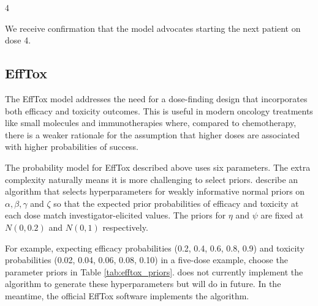 \documentclass[article]{jss}
\begin{document}
\begin{CodeChunk}


\begin{CodeOutput}
[1] 4
\end{CodeOutput}
\end{CodeChunk}

We receive confirmation that the model advocates starting the next
patient on dose 4.

\hypertarget{efftox-1}{%
\subsection{EffTox}\label{efftox-1}}

The EffTox model addresses the need for a dose-finding design that
incorporates both efficacy and toxicity outcomes. This is useful in
modern oncology treatments like small molecules and immunotherapies
where, compared to chemotherapy, there is a weaker rationale for the
assumption that higher doses are associated with higher probabilities of
success.

The probability model for EffTox described above uses six parameters.
The extra complexity naturally means it is more challenging to select
priors. \citet{Thall2014} describe an algorithm that selects
hyperparameters for weakly informative normal priors on
\(\alpha, \beta, \gamma\) and \(\zeta\) so that the expected prior
probabilities of efficacy and toxicity at each dose match
investigator-elicited values. The priors for \(\eta\) and \(\psi\) are
fixed at \(N(0, 0.2)\) and \(N(0, 1)\) respectively.

For example, expecting efficacy probabilities (0.2, 0.4, 0.6, 0.8, 0.9)
and toxicity probabilities (0.02, 0.04, 0.06, 0.08, 0.10) in a five-dose
example, \citet{Thall2014} choose the parameter priors in Table
\ref{tab:efftox_priors}.  does not currently implement the
algorithm to generate these hyperparameters but will do in future. In
the meantime, the official EffTox software implements the algorithm.
\end{document}
